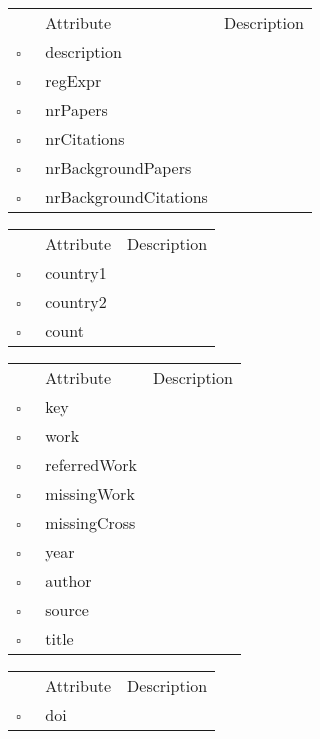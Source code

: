 \clearpage
\begin{table}
\caption{ConferenceSeries  }

\begin{longtable}{llp{8cm}}
& Attribute & Description \\
$\square$\ & description &  \\
$\square$\ & regExpr &  \\
$\square$\ & nrPapers &  \\
$\square$\ & nrCitations &  \\
$\square$\ & nrBackgroundPapers &  \\
$\square$\ & nrBackgroundCitations &  \\
\end{longtable}
\label{attr:ConferenceSeries}
\end{table}

\begin{table}
\caption{CountryCollab  }

\begin{longtable}{llp{8cm}}
& Attribute & Description \\
$\square$\ & country1 &  \\
$\square$\ & country2 &  \\
$\square$\ & count &  \\
\end{longtable}
\label{attr:CountryCollab}
\end{table}

\begin{table}
\caption{CrossReference  }

\begin{longtable}{llp{8cm}}
& Attribute & Description \\
$\square$\ & key &  \\
$\square$\ & work &  \\
$\square$\ & referredWork &  \\
$\square$\ & missingWork &  \\
$\square$\ & missingCross &  \\
$\square$\ & year &  \\
$\square$\ & author &  \\
$\square$\ & source &  \\
$\square$\ & title &  \\
\end{longtable}
\label{attr:CrossReference}
\end{table}

\begin{table}
\caption{DoiReference  }

\begin{longtable}{llp{8cm}}
& Attribute & Description \\
$\square$\ & doi &  \\
\end{longtable}
\label{attr:DoiReference}
\end{table}

